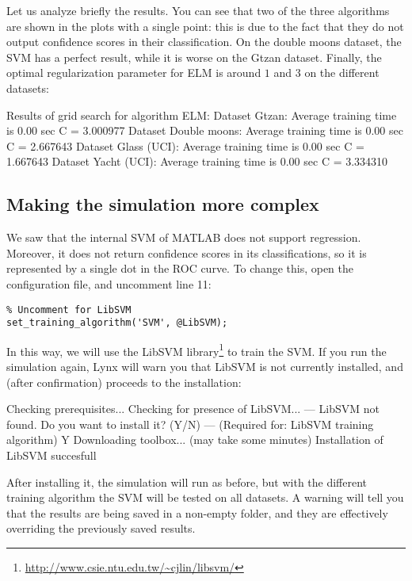 Let us analyze briefly the results. You can see that two of the three algorithms are shown in the plots with a single point: this is due to the fact that they do not output confidence scores in their classification. On the double moons dataset, the SVM has a perfect result, while it is worse on the Gtzan dataset. Finally, the optimal regularization parameter for ELM is around $1$ and $3$ on the different datasets:

\begin{console}
Results of grid search for algorithm ELM: 
  Dataset Gtzan:
    Average training time is 0.00 sec
    C = 3.000977
  Dataset Double moons:
    Average training time is 0.00 sec
    C = 2.667643
  Dataset Glass (UCI):
    Average training time is 0.00 sec
    C = 1.667643
  Dataset Yacht (UCI):
    Average training time is 0.00 sec
    C = 3.334310
\end{console}

\subsection{Making the simulation more complex}

We saw that the internal SVM of MATLAB does not support regression. Moreover, it does not return confidence scores in its classifications, so it is represented by a single dot in the ROC curve. To change this, open the configuration file, and uncomment line 11:

\begin{lstlisting}
% Uncomment for LibSVM
set_training_algorithm('SVM', @LibSVM); 
\end{lstlisting}

\noindent In this way, we will use the LibSVM library\footnote{\url{http://www.csie.ntu.edu.tw/~cjlin/libsvm/}} to train the SVM. If you run the simulation again, Lynx will warn you that LibSVM is not currently installed, and (after confirmation) proceeds to the installation:

\begin{console}
Checking prerequisites...
Checking for presence of LibSVM...
--- LibSVM not found. Do you want to install it? (Y/N) ---
(Required for: LibSVM training algorithm)
Y
Downloading toolbox... (may take some minutes)
Installation of LibSVM succesfull
\end{console}

\noindent After installing it, the simulation will run as before, but with the different training algorithm the SVM will be tested on all datasets. A warning will tell you that the results are being saved in a non-empty folder, and they are effectively overriding the previously saved results.

